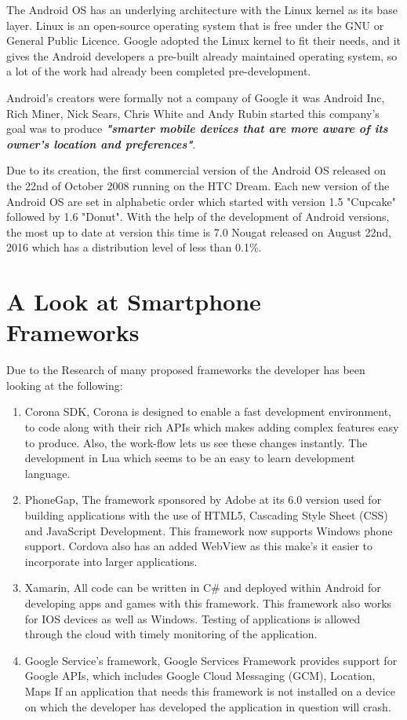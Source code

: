 The Android OS has an underlying architecture with the Linux kernel as its base layer. Linux is an open-source operating system that is free under the GNU or General Public Licence. Google adopted the Linux kernel to fit their needs, and it gives the Android developers a pre-built already maintained operating system, so a lot of the work had already been completed pre-development. \cite{androidLinux}

Android's creators were formally not a company of Google it was Android Inc, Rich Miner, Nick Sears, Chris White and Andy Rubin started this company's goal was to produce \textbf{\textit{ "smarter mobile devices that are more aware of its owner's location and preferences"}}. \cite{BenElgin} \par

Due to its creation, the first commercial version of the Android OS released on the 22nd of October 2008 running on the HTC Dream. \cite{androidHtc} Each new version of the Android OS are set in alphabetic order which started with version 1.5 "Cupcake" followed by 1.6 "Donut". With the help of the development of Android versions, the most up to date at version this time is 7.0 Nougat released on August 22nd, 2016 which has a distribution level of less than 0.1\%.

\section{A Look at Smartphone Frameworks}
Due to the Research of many proposed frameworks the developer has been looking at the following:
\begin{enumerate}
	\item Corona SDK,
	Corona is designed to enable a fast development environment, to code along with their rich APIs which makes adding complex features easy to produce. Also, the work-flow lets us see these changes instantly. The development in Lua which seems to be an easy to learn development language. \cite{williams2013corona}
	\item PhoneGap,
	The framework sponsored by Adobe at its 6.0 version used for building applications with the use of HTML5, Cascading Style Sheet (CSS) and JavaScript Development. This framework now supports Windows phone support. Cordova also has an added WebView as this make's it easier to incorporate into larger applications.\cite{myer2011beginning}
	\item Xamarin,
	All code can be written in C\# and deployed within Android for developing apps and games with this framework. This framework also works for IOS devices as well as Windows. Testing of applications is allowed through the cloud with timely monitoring of the application. \cite{dickson2013xamarin}
	\item Google Service's framework,
	Google Services Framework provides support for Google APIs, which includes Google Cloud Messaging (GCM), Location, Maps If an application that needs this framework is not installed on a device on which the developer has developed the application in question will crash.\cite{fogl2016intelligent}
\end{enumerate}


